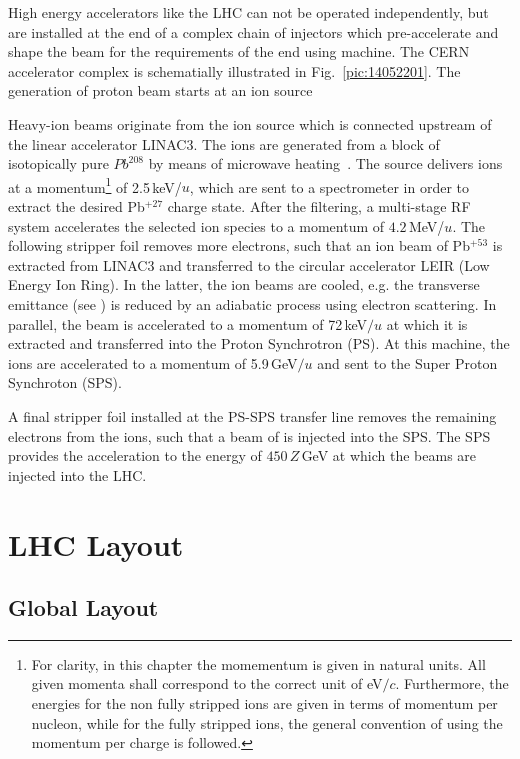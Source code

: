High energy accelerators like the LHC can not be operated independently, but are installed at the end of a complex chain of injectors which pre-accelerate and shape the beam for the requirements of the end using machine. The CERN accelerator complex is schematially illustrated in Fig.~\ref{pic:14052201}. The generation of proton beam starts at an ion source 

Heavy-ion beams originate from the ion source which is connected upstream of the linear accelerator LINAC3. The ions are generated from a block of isotopically pure $Pb^{208}$ by means of microwave heating~\cite{}. The source delivers ions at a momentum\footnote{For clarity, in this chapter the momementum is given in natural units. All given momenta shall correspond to the correct unit of eV$/c$. Furthermore, the energies for the non fully stripped ions are given in terms of momentum per nucleon, while for the fully stripped ions, the general convention of using the momentum per charge is followed.} of 2.5\,keV/$u$, which are sent to a spectrometer in order to extract the desired Pb$^{+27}$ charge state. After the filtering, a multi-stage RF system accelerates the selected ion species to a momentum of $4.2\,$MeV/$u$. The following stripper foil removes more electrons, such that an ion beam of Pb$^{+53}$ is extracted from LINAC3 and transferred to the circular accelerator LEIR (Low Energy Ion Ring). In the latter, the ion beams are cooled, e.g. the transverse emittance (see \chapref{}) is reduced by an adiabatic process using electron scattering. In parallel, the beam is accelerated to a momentum of 72$\,$keV$/u$ at which it is extracted and transferred into the Proton Synchrotron (PS). At this machine, the ions are accelerated to a momentum of 5.9$\,$GeV$/u$ and sent to the Super Proton Synchroton (SPS). 

A final stripper foil installed at the PS-SPS transfer line removes the remaining electrons from the ions, such that a beam of \lead is injected into the SPS. The SPS provides the acceleration to the energy of $450\,Z\,$GeV at which the beams are injected into the LHC.


\section{LHC Layout}
\subsection{Global Layout}

